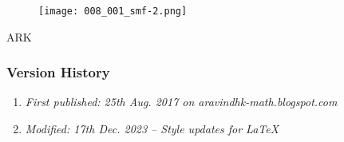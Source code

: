 \begin{figure}[H]
	\centering
	\texttt{[image: 008\_001\_smf-2.png]}
\end{figure}

ARK

\subsubsection{Version History}
\begin{enumerate}
	\item \emph{First published: 25th Aug. 2017 on aravindhk-math.blogspot.com}
	\item \emph{Modified: 17th Dec. 2023 -- Style updates for \LaTeX}
\end{enumerate}
